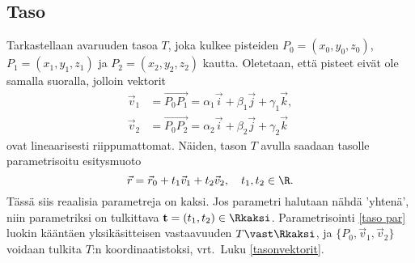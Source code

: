 \subsection*{Taso}

Tarkastellaan avaruuden tasoa $T$, joka kulkee pisteiden $P_0=(x_0,y_0,z_0)$,
$P_1=(x_1,y_1,z_1)$ ja $P_2=(x_2,y_2,z_2)$ kautta. Oletetaan, että pisteet eivät ole
samalla suoralla, jolloin vektorit
\begin{align*}
\vec v_1 &= \overrightarrow{P_0P_1} = \alpha_1 \vec i + \beta_1 \vec j + \gamma_1 \vec k, \\
\vec v_2 &= \overrightarrow{P_0P_2} = \alpha_2 \vec i + \beta_2 \vec j + \gamma_2 \vec k
\end{align*}
ovat lineaarisesti riippumattomat. Näiden, tason $T$
%
 avulla saadaan
tasolle parametrisoitu esitysmuoto
\begin{equation} \label{taso par}
\vec r = \vec r_0 + t_1 \vec v_1 + t_2 \vec v_2, \quad t_1, t_2 \in \R.
\end{equation}
%
Tässä siis reaalisia parametreja on kaksi. Jos parametri halutaan nähdä 'yhtenä', niin
parametriksi on tulkittava $\mathbf{t}=(t_1,t_2)\in\Rkaksi$. Parametrisointi \eqref{taso par}
luokin kääntäen yksikäsitteisen vastaavuuden $T\vast\Rkaksi$, ja $\{P_0,\vec v_1,\vec v_2\}$
voidaan tulkita $T$:n koordinaatistoksi, vrt.\ Luku \ref{tasonvektorit}. 

